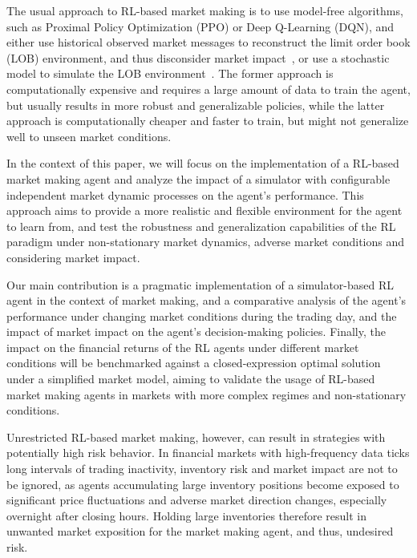 The usual approach to RL-based market making is to use model-free algorithms, such as Proximal Policy Optimization (PPO) or Deep Q-Learning (DQN),
and either use historical observed market messages to reconstruct the limit order book (LOB) environment,
and thus disconsider market impact~\cite{Frey2023, Ganesh2019}, or use a stochastic model to simulate the LOB environment~\cite{Gasperov2021, Sun2022}.
The former approach is computationally expensive and requires a large amount of data to train the agent,
but usually results in more robust and generalizable policies, while the latter approach is computationally cheaper and faster to train,
but might not generalize well to unseen market conditions.

In the context of this paper, we will focus on the implementation of a RL-based market making agent and
analyze the impact of a simulator with configurable independent market dynamic processes on the agent's performance.
This approach aims to provide a more realistic and flexible environment for the agent to learn from,
and test the robustness and generalization capabilities of the RL paradigm under non-stationary
market dynamics, adverse market conditions and considering market impact.

Our main contribution is a pragmatic implementation of a simulator-based RL agent in the context of market making,
and a comparative analysis of the agent's performance under changing market conditions during the
trading day, and the impact of market impact on the agent's decision-making policies.
Finally, the impact on the financial returns of the RL agents under different market conditions will be benchmarked against a closed-expression optimal solution under a simplified market model,
aiming to validate the usage of RL-based market making agents in markets with more complex regimes and non-stationary conditions.

Unrestricted RL-based market making, however, can result in strategies with potentially high risk behavior.
In financial markets with high-frequency data ticks long intervals of trading inactivity, inventory risk and market impact are not to be ignored,
as agents accumulating large inventory positions become exposed to significant price fluctuations and adverse market direction changes, especially overnight after closing hours.
Holding large inventories therefore result in unwanted market exposition for the market making agent, and thus, undesired risk.

